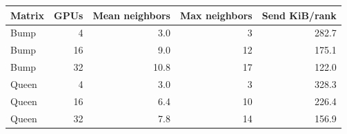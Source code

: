 \begin{tabular}{lrrrr}
\toprule
Matrix & GPUs & Mean neighbors & Max neighbors & Send KiB/rank\\
\midrule
Bump & 4 & 3.0 & 3 & 282.7\\
Bump & 16 & 9.0 & 12 & 175.1\\
Bump & 32 & 10.8 & 17 & 122.0\\
Queen & 4 & 3.0 & 3 & 328.3\\
Queen & 16 & 6.4 & 10 & 226.4\\
Queen & 32 & 7.8 & 14 & 156.9\\
\bottomrule
\end{tabular}
